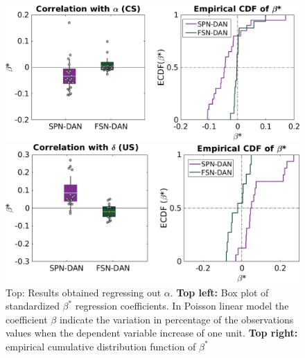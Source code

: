 \begin{figure}[!h]
    \centering
    \includegraphics[scale=0.5]{figures/alphaRegrNew2.png}
    
    \vspace{1cm}
    \includegraphics[scale=0.5]{figures/deltaRegr2.png}
    \caption{Top: Results obtained regressing out $\alpha$. \textbf{Top left:} Box plot of standardized $\beta^*$ regression coefficients. In Poisson linear model the coefficient $\beta$ indicate the variation in percentage of the observations values when the dependent variable increase of one unit. \textbf{Top right:} empirical cumulative distribution function of $\beta^*$}
    \label{fig:AlphaDeltaReg}
\end{figure}\\
